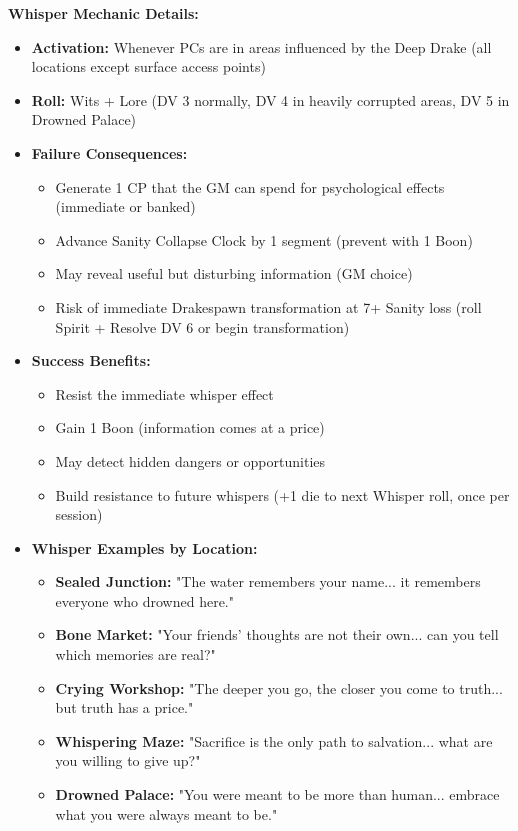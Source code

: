 \documentclass[11pt]{article}
\begin{document}
\textbf{Whisper Mechanic Details:}
\begin{itemize}
\item \textbf{Activation:} Whenever PCs are in areas influenced by the Deep Drake (all locations except surface access points)
\item \textbf{Roll:} Wits + Lore (DV 3 normally, DV 4 in heavily corrupted areas, DV 5 in Drowned Palace)
\item \textbf{Failure Consequences:}
  \begin{itemize}
  \item Generate 1 CP that the GM can spend for psychological effects (immediate or banked)
  \item Advance Sanity Collapse Clock by 1 segment (prevent with 1 Boon)
  \item May reveal useful but disturbing information (GM choice)
  \item Risk of immediate Drakespawn transformation at 7+ Sanity loss (roll Spirit + Resolve DV 6 or begin transformation)
  \end{itemize}
\item \textbf{Success Benefits:}
  \begin{itemize}
  \item Resist the immediate whisper effect
  \item Gain 1 Boon (information comes at a price)
  \item May detect hidden dangers or opportunities
  \item Build resistance to future whispers (+1 die to next Whisper roll, once per session)
  \end{itemize}
\item \textbf{Whisper Examples by Location:}
  \begin{itemize}
  \item \textbf{Sealed Junction:} "The water remembers your name... it remembers everyone who drowned here."
  \item \textbf{Bone Market:} "Your friends' thoughts are not their own... can you tell which memories are real?"
  \item \textbf{Crying Workshop:} "The deeper you go, the closer you come to truth... but truth has a price."
  \item \textbf{Whispering Maze:} "Sacrifice is the only path to salvation... what are you willing to give up?"
  \item \textbf{Drowned Palace:} "You were meant to be more than human... embrace what you were always meant to be."
  \end{itemize}
\end{itemize}
\end{document}
